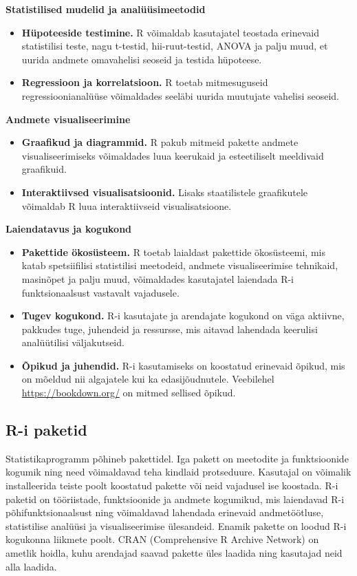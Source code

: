\documentclass[
]{book}
\providecommand{\tightlist}{%
  \setlength{\itemsep}{0pt}\setlength{\parskip}{0pt}}
\theoremstyle{definition}
\theoremstyle{definition}
\theoremstyle{definition}
\theoremstyle{definition}
\theoremstyle{remark}
\begin{document}
\textbf{Statistilised mudelid ja analüüsimeetodid}

\begin{itemize}
\tightlist
\item
  \textbf{Hüpoteeside testimine.} R võimaldab kasutajatel teostada erinevaid statistilisi teste, nagu t-testid, hii-ruut-testid, ANOVA ja palju muud, et uurida andmete omavahelisi seoseid ja testida hüpoteese.
\item
  \textbf{Regressioon ja korrelatsioon.} R toetab mitmesuguseid regressioonianalüüse võimaldades seeläbi uurida muutujate vahelisi seoseid.
\end{itemize}

\textbf{Andmete visualiseerimine}

\begin{itemize}
\tightlist
\item
  \textbf{Graafikud ja diagrammid.} R pakub mitmeid pakette andmete visualiseerimiseks võimaldades luua keerukaid ja esteetiliselt meeldivaid graafikuid.
\item
  \textbf{Interaktiivsed visualisatsioonid.} Lisaks staatilistele graafikutele võimaldab R luua interaktiivseid visualisatsioone.
\end{itemize}

\textbf{Laiendatavus ja kogukond}

\begin{itemize}
\tightlist
\item
  \textbf{Pakettide ökosüsteem.} R toetab laialdast pakettide ökosüsteemi, mis katab spetsiifilisi statistilisi meetodeid, andmete visualiseerimise tehnikaid, masinõpet ja palju muud, võimaldades kasutajatel laiendada R-i funktsionaalsust vastavalt vajadusele.
\item
  \textbf{Tugev kogukond.} R-i kasutajate ja arendajate kogukond on väga aktiivne, pakkudes tuge, juhendeid ja ressursse, mis aitavad lahendada keerulisi analüütilisi väljakutseid.
\item
  \textbf{Õpikud ja juhendid.} R-i kasutamiseks on koostatud erinevaid õpikud, mis on mõeldud nii algajatele kui ka edasijõudnutele. Veebilehel \url{https://bookdown.org/} on mitmed sellised õpikud.
\end{itemize}

\subsection{R-i paketid}\label{r-i-paketid}

Statistikaprogramm põhineb pakettidel. Iga pakett on meetodite ja funktsioonide kogumik ning need võimaldavad teha kindlaid protseduure. Kasutajal on võimalik installeerida teiste poolt koostatud pakette või neid vajadusel ise koostada. R-i paketid on tööriistade, funktsioonide ja andmete kogumikud, mis laiendavad R-i põhifunktsionaalsust ning võimaldavad lahendada erinevaid andmetöötluse, statistilise analüüsi ja visualiseerimise ülesandeid. Enamik pakette on loodud R-i kogukonna liikmete poolt. CRAN (Comprehensive R Archive Network) on ametlik hoidla, kuhu arendajad saavad pakette üles laadida ning kasutajad neid alla laadida.
\end{document}
